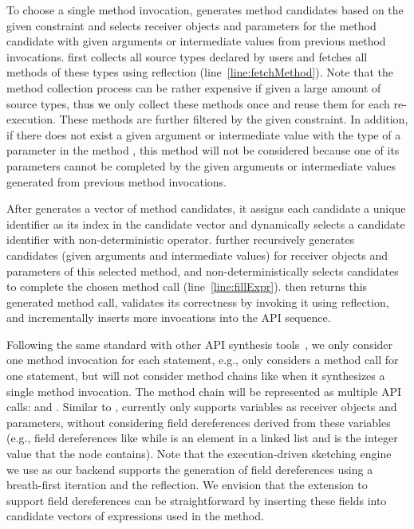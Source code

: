     To choose a single method invocation, \tool generates method candidates based on the given constraint and selects receiver objects and parameters for the method candidate with given arguments or intermediate values from previous method invocations. \tool first collects all  source types declared by users and fetches all methods of these types using reflection (line~\ref{line:fetchMethod}). Note that the method collection process can be rather expensive if given a large amount of source types, thus we only collect these methods once and reuse them for each re-execution.   These methods are further filtered by the given constraint. In addition, if there does not exist a given argument or intermediate value with the type of a parameter in the method , this method will not be considered because one of its parameters cannot be completed by the given arguments or intermediate values generated from previous method invocations.  

After \tool generates a vector of method candidates, it assigns each candidate a unique identifier as its index in the candidate vector and dynamically selects a  candidate identifier with non-deterministic  operator. \tool further recursively generates candidates (given arguments and intermediate values) for  receiver objects and parameters of this selected method, and non-deterministically selects candidates to complete the chosen method call (line~\ref{line:fillExpr}). \tool then returns this generated method call, validates its correctness by invoking it using reflection,  and incrementally inserts more invocations into the API sequence. 

Following the same standard with other API synthesis tools~\cite{isil:sypet17,  codehint:icse14}, we only consider one method invocation for each statement, e.g., \tool only considers a method call  for one statement, but will not consider method chains like   when it synthesizes a single method invocation. The method chain will be represented as multiple API calls:  and .  Similar to \spt,   \tool currently only supports variables as receiver objects and parameters, without considering  field dereferences derived from these variables (e.g., field dereferences like  while  is an element in a linked list and  is the integer value that the node contains). Note that the execution-driven sketching engine~\cite{sketch4j:spin17} we use as our backend supports the generation of field dereferences using a breath-first iteration and the reflection. We envision that the extension to support field dereferences can be straightforward by inserting these fields into candidate vectors of expressions used in the method. 



